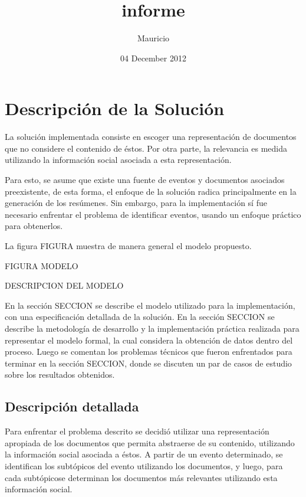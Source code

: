 \documentclass[upright, contnum]{umemoria}
\title{informe}
\author{Mauricio}
\date{04 December 2012}
\begin{document}
\maketitle

\setcounter{tocdepth}{3}
\tableofcontents
\vspace*{1cm}

\chapter{Descripción de la Solución}
\label{sec-1}


  La solución implementada consiste en escoger una
  representación de documentos que no considere el contenido de
  éstos. Por otra parte, la relevancia es medida utilizando la
  información social asociada a esta representación.

  Para esto, se asume que existe una fuente de eventos y documentos
  asociados preexistente, de esta forma, el enfoque de la solución
  radica principalmente en la generación de los resúmenes. Sin
  embargo, para la implementación sí fue necesario enfrentar el
  problema de identificar eventos, usando un enfoque práctico para
  obtenerlos.

  La figura FIGURA muestra de manera general el modelo propuesto.

  FIGURA MODELO

  DESCRIPCION DEL MODELO

  En la sección SECCION se describe el modelo utilizado para la
  implementación, con una especificación detallada de la solución. En la
  sección SECCION se describe la metodología de desarrollo y la
  implementación práctica realizada para representar el modelo
  formal, la cual considera la obtención de datos dentro del
  proceso. Luego se comentan los problemas técnicos que fueron
  enfrentados para terminar en la sección SECCION, donde se discuten
  un par de casos de estudio sobre los resultados obtenidos.

\section{Descripción detallada}
\label{sec-1.1}


   Para enfrentar el problema descrito se decidió utilizar una
   representación apropiada de los documentos que permita abstraerse
   de su contenido, utilizando la información social asociada a
   éstos. A partir de un evento determinado, se identifican los
   subtópicos del evento utilizando los documentos, y luego, para cada
   subtópicose determinan los documentos más relevantes utilizando
   esta información social.
\end{document}
